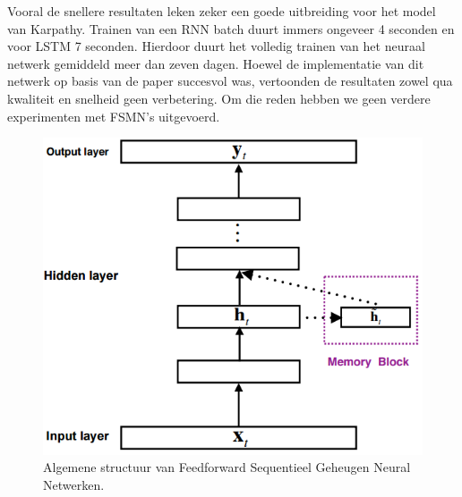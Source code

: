 Vooral de snellere resultaten leken zeker een goede uitbreiding voor het model van Karpathy. Trainen van een RNN batch duurt immers ongeveer 4 seconden en voor LSTM 7 seconden. Hierdoor duurt het volledig trainen van het neuraal netwerk gemiddeld meer dan zeven dagen.
Hoewel de implementatie van dit netwerk op basis van de paper succesvol was, vertoonden de resultaten zowel qua kwaliteit en snelheid geen verbetering. Om die reden hebben we geen verdere experimenten met FSMN's uitgevoerd.

\begin{figure}[tb]
	\centering
	\includegraphics[width=0.6\linewidth]{Images/FSMN}
	\caption{Algemene structuur van Feedforward Sequentieel Geheugen Neural Netwerken.}
	\label{fig:fsmn}
\end{figure}
